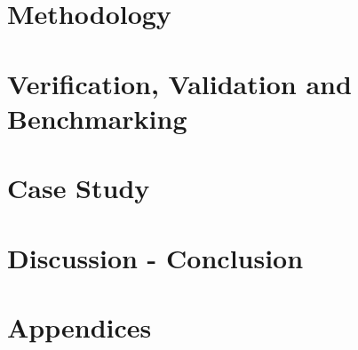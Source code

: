 \documentclass[11pt]{article}
\begin{document}
\newpage
\section{Methodology} \label{workflow}


\newpage
\section{Verification, Validation and Benchmarking} \label{toy}



\newpage
\section{Case Study} \label{caseStud}



\newpage
\section{Discussion - Conclusion} \label{discConcl}



\newpage
\appendix

\section{Appendices}



\newpage
\thispagestyle{plain}
\AtNextBibliography{\small}
\printbibliography
\end{document}
